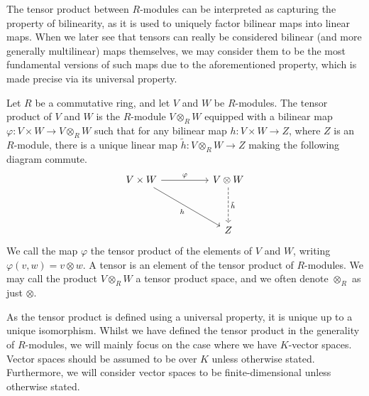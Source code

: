 \documentclass[a4paper,12pt]{article}
\begin{document}
The tensor product between $R$-modules can be interpreted as capturing the property of bilinearity, as it is used to uniquely factor bilinear maps into linear maps.
When we later see that tensors can really be considered bilinear (and more generally multilinear) maps themselves, we may consider them to be the most fundamental versions of such maps due to the aforementioned property, which is made precise via its universal property.
\begin{definition}\label{def:tensor_product}
    Let $R$ be a commutative ring, and let $V$ and $W$ be $R$-modules.
    The tensor product of $V$ and $W$ is the $R$-module $V \otimes_R W$ equipped with a bilinear map $\varphi \colon V \times W \to V \otimes_R W$ such that for any bilinear map $h \colon V \times W \to Z$, where $Z$ is an $R$-module, there is a unique linear map $\tilde{h} \colon V \otimes_R W \to Z$ making the following diagram commute.
    \[\begin{tikzcd}
        {V \times W} && {V \otimes W} \\
        \\
        && Z
        \arrow["\varphi", from=1-1, to=1-3]
        \arrow["h"', from=1-1, to=3-3]
        \arrow["{\tilde{h}}", dashed, from=1-3, to=3-3]
    \end{tikzcd}\]
    We call the map $\varphi$ the tensor product of the elements of $V$ and $W$, writing $\varphi(v, w) = v \otimes w$.
    A tensor is an element of the tensor product of $R$-modules.
    We may call the product $V \otimes_R W$ a tensor product space, and we often denote $\otimes_R$ as just $\otimes$.
\end{definition}
As the tensor product is defined using a universal property, it is unique up to a unique isomorphism.
Whilst we have defined the tensor product in the generality of $R$-modules, we will mainly focus on the case where we have $K$-vector spaces.
Vector spaces should be assumed to be over $K$ unless otherwise stated.
Furthermore, we will consider vector spaces to be finite-dimensional unless otherwise stated.
\end{document}
